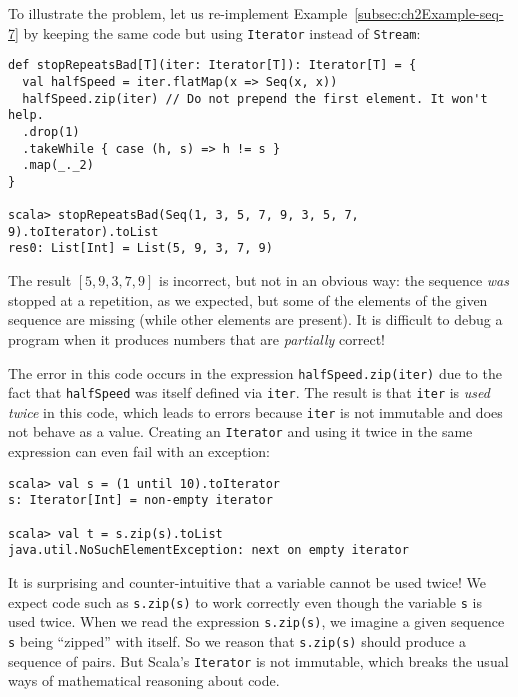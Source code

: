 To illustrate the problem, let us re-implement Example~\ref{subsec:ch2Example-seq-7}
by keeping the same code but using \lstinline!Iterator!
instead of \lstinline!Stream!:
\begin{lstlisting}
def stopRepeatsBad[T](iter: Iterator[T]): Iterator[T] = {
  val halfSpeed = iter.flatMap(x => Seq(x, x))
  halfSpeed.zip(iter) // Do not prepend the first element. It won't help.
  .drop(1)
  .takeWhile { case (h, s) => h != s }
  .map(_._2)
}

scala> stopRepeatsBad(Seq(1, 3, 5, 7, 9, 3, 5, 7, 9).toIterator).toList
res0: List[Int] = List(5, 9, 3, 7, 9)
\end{lstlisting}
The result $\left[5,9,3,7,9\right]$ is incorrect, but not in an obvious
way: the sequence \emph{was} stopped at a repetition, as we expected,
but some of the elements of the given sequence are missing (while
other elements are present). It is difficult to debug a program when
it produces numbers that are \emph{partially} correct! 

The error in this code occurs in the expression \lstinline!halfSpeed.zip(iter)!
due to the fact that \lstinline!halfSpeed!
was itself defined via \lstinline!iter!.
The result is that \lstinline!iter!
is \emph{used twice} in this code, which leads to errors because \lstinline!iter!
is not immutable and does not behave as a value. Creating an \lstinline!Iterator!
and using it twice in the same expression can even fail with an exception:
\begin{lstlisting}
scala> val s = (1 until 10).toIterator
s: Iterator[Int] = non-empty iterator

scala> val t = s.zip(s).toList
java.util.NoSuchElementException: next on empty iterator
\end{lstlisting}
It is surprising and counter-intuitive that a variable cannot be used
twice! We expect code such as \lstinline!s.zip(s)!
to work correctly even though the variable \lstinline!s!
is used twice. When we read the expression \lstinline!s.zip(s)!,
we imagine a given sequence \lstinline!s!
being ``zipped'' with itself. So we reason that \lstinline!s.zip(s)!
should produce a sequence of pairs. But Scala's \lstinline!Iterator!
is not immutable, which breaks the usual ways of mathematical reasoning
about code.

